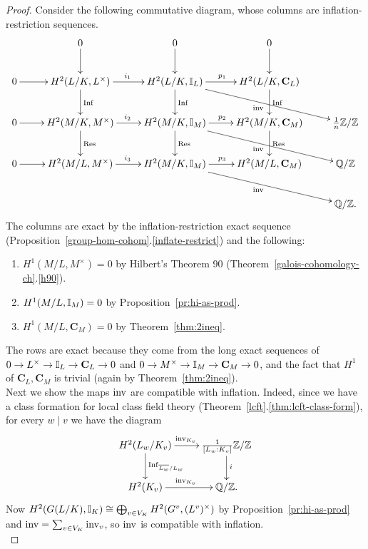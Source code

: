 \begin{proof}
Consider the following commutative diagram, whose columns are inflation-restriction sequences.
\[
\xymatrix{
& 0\ar[d] & 0\ar[d] & 0\ar[d]&\\
0\ar[r] & H^2(L/K,L^{\times}) \ar[r]^{i_1} \ar[d]^{\Inf} & H^2(L/K, \I_L) \ar[r]^{p_1} \ar[d]^{\Inf}\ar[rrd]_{\inv} & H^2(L/K,\mathbf C_L) \ar[d]^{\Inf}&\\
0\ar[r] & H^2(M/K,M^{\times}) \ar[r]^{i_2}\ar[d]^{\Res} & H^2(M/K,\I_M)\ar[r]^{p_2}\ar[d]^{\Res}\ar[rrd]_{\inv} & H^2(M/K,\mathbf C_M)\ar[d]^{\Res} & \rc n\Z/\Z\\
0\ar[r] & H^2(M/L,M^{\times}) \ar[r]^{i_3} & H^2(M/K,\I_M)\ar[rrd]_{\inv}\ar[r]^{p_3} & H^2(M/L,\mathbf C_M) & \Q/\Z\\
&&&&\Q/\Z.
}
\]
The columns are exact by the inflation-restriction exact sequence (Proposition~\ref{group-hom-cohom}.\ref{inflate-restrict}) and the following:
\begin{enumerate}
\item
$H^1(M/L,M^{\times})=0$ by Hilbert's Theorem 90 (Theorem~\ref{galois-cohomology-ch}.\ref{h90}).
\item
$H^1(M/L, \mathbb{I}_M)=0$ by Proposition~\ref{pr:hi-as-prod}.
\item
$H^1(M/L,\mathbf C_M)=0$ by Theorem~\ref{thm:2ineq}.
\end{enumerate}
The rows are exact because they come from the long exact sequences of $0\to L^{\times}\to \mathbb{I}_L\to \mathbf C_L\to 0$ and $0\to M^{\times}\to \mathbb{I}_M\to\mathbf C_M\to 0$, and the fact that $H^1$ of $\mathbf C_L,\mathbf C_M$ is trivial (again by Theorem~\ref{thm:2ineq}).\\

 Next we show the maps $\operatorname{inv}$ are compatible with inflation. Indeed, since we have a class formation for local class field theory (Theorem~\ref{lcft}.\ref{thm:lcft-class-form}), for every $w\mid v$ we have the diagram %
\[
\xymatrix{
H^2(L_w/K_v)\ar[r]^{\inv_{K_v}}\ar[d]^{\Inf_{\ol {L_w}/L_w}} & \rc{[L_w:K_v]}\Z/\Z\ar[d]^{i} \\
H^2(K_v)\ar[r]^{\inv_{K_v}} & \Q/\Z.
}
\]
Now $H^2(G(L/K),\mathbb{I}_K)\cong \bigoplus_{v\in V_{K}} H^2(G^v,(L^v)^{\times})$ by Proposition~\ref{pr:hi-as-prod} and $\operatorname{inv}=\sum_{v\in V_K}\operatorname{inv}_v$, so $\operatorname{inv}$ is compatible with inflation.\\


\end{proof}

